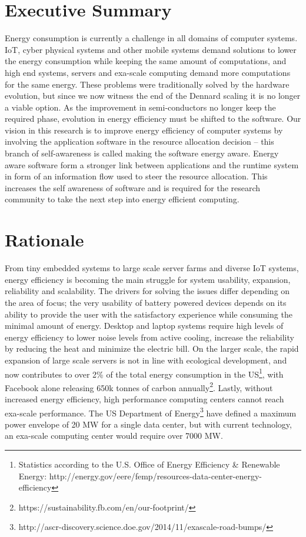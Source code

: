 \documentclass{article}
\begin{document}
\section{Executive Summary}
Energy consumption is currently a challenge in all domains of computer systems.
IoT, cyber physical systems and other mobile systems demand solutions to lower the energy consumption while keeping the same amount of computations,
and high end systems, servers and exa-scale computing demand more computations for the same energy.
These problems were traditionally solved by the hardware evolution, but since we now witness the end of the Dennard scaling \cite{Dennard:74} it is no longer a viable option.
As the improvement in semi-conductors no longer keep the required phase, evolution in energy efficiency must be shifted to the software.
Our vision in this research is to improve energy efficiency of computer systems by involving the application software in the resource allocation decision -- this branch of self-awareness is called making the software energy aware.
Energy aware software form a stronger link between applications and the runtime system in form of an information flow used to steer the resource allocation.
This increases the self awareness of software and is required for the research community to take the next step into energy efficient computing.

\section{Rationale}
From tiny embedded systems to large scale server farms and diverse IoT systems, energy efficiency is becoming the main struggle for system usability, expansion, reliability and scalability.
The drivers for solving the issues differ depending on the area of focus;
the very usability of battery powered devices depends on its ability to provide the user with the satisfactory experience while consuming the minimal amount of energy.
Desktop and laptop systems require high levels of energy efficiency to lower noise levels from active cooling, increase the reliability by reducing the heat and minimize the electric bill.
On the larger scale, the rapid expansion of large scale servers is not in line with ecological development, and now contributes to over 2\% of the total energy consumption in the US\footnote{Statistics according to the U.S. Office of Energy Efficiency \& Renewable Energy: http://energy.gov/eere/femp/resources-data-center-energy-efficiency}, with Facebook alone releasing 650k tonnes of carbon annually\footnote{https://sustainability.fb.com/en/our-footprint/}.
Lastly, without increased energy efficiency, high performance computing centers cannot reach exa-scale performance.
The US Department of Energy\footnote{http://ascr-discovery.science.doe.gov/2014/11/exascale-road-bumps/} have defined a maximum power envelope of 20 MW for a single data center, but with current technology, an exa-scale computing center would require over 7000 MW.\smallskip
\end{document}
